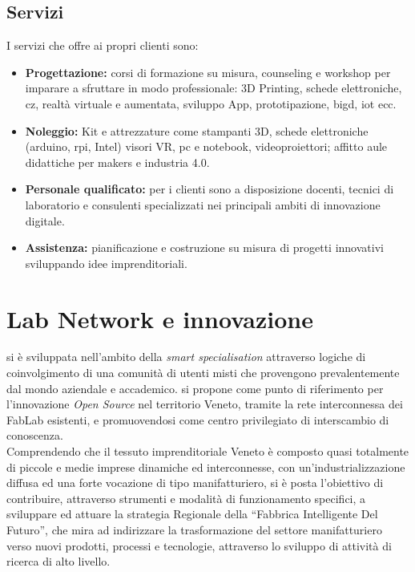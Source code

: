 \subsection{Servizi}
I servizi che \lab{} offre ai propri clienti sono:
\begin{itemize}
\item \textbf{Progettazione:} corsi di formazione su misura, \gls{counseling} e \gls{workshop} per imparare a sfruttare in modo professionale: 3D Printing, schede elettroniche, \gls{cz}, realtà virtuale e aumentata, sviluppo App, prototipazione, \gls{bigd}, \gls{iot} ecc.
\item \textbf{Noleggio:} Kit e attrezzature come stampanti 3D, schede elettroniche (\gls{arduino}, \gls{rpi}, Intel) visori VR, pc e notebook, videoproiettori; affitto aule didattiche per \gls{makers} e industria 4.0.
\item \textbf{Personale qualificato:} per i clienti sono a disposizione docenti, tecnici di laboratorio e consulenti specializzati nei principali ambiti di innovazione digitale.
\item \textbf{Assistenza:} pianificazione e costruzione su misura di progetti innovativi sviluppando idee imprenditoriali.
\end{itemize}

\section{Lab Network e innovazione}
\lab{} si è sviluppata nell’ambito della \textit{smart specialisation} attraverso logiche di coinvolgimento di una comunità di utenti misti che provengono prevalentemente dal mondo aziendale e accademico. 
\lab{} si propone come punto di riferimento per l’innovazione \textit{Open Source} nel territorio Veneto, tramite la rete interconnessa dei \gls{FabLab} esistenti, e promuovendosi come centro privilegiato di interscambio di conoscenza.\\
Comprendendo che il tessuto imprenditoriale Veneto è composto quasi totalmente di piccole e medie imprese dinamiche ed interconnesse, con un’industrializzazione diffusa ed una forte vocazione di tipo manifatturiero, \lab{} si è posta l’obiettivo di contribuire, attraverso strumenti e modalità di funzionamento specifici, a sviluppare ed attuare la strategia Regionale della ``Fabbrica Intelligente Del Futuro'', che mira ad indirizzare la trasformazione del settore manifatturiero verso nuovi prodotti, processi e tecnologie, attraverso lo sviluppo di attività di ricerca di alto livello.

